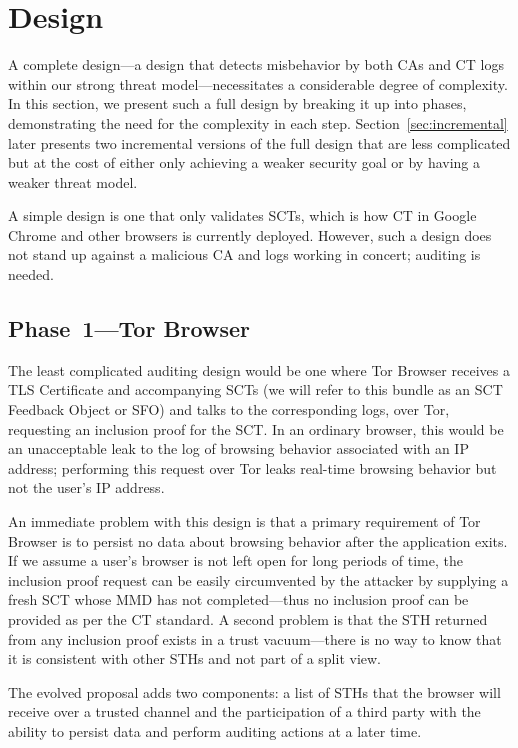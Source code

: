 \section{Design} \label{sec:base}

A complete design---a design that detects misbehavior by both CAs and CT logs
within our strong threat model---necessitates a considerable degree of
complexity. In this section, we present such a full design by breaking it up
into phases, demonstrating the need for the complexity in each step.
Section~\ref{sec:incremental} later presents two incremental versions of the
full design that are less complicated but at the cost of either only achieving a
weaker security goal or by having a weaker threat model.

A simple design is one that only validates SCTs, which is how CT in Google
Chrome and other browsers is currently deployed. However, such a design does not
stand up against a malicious CA and logs working in concert; auditing is needed.

\subsection{Phase~1---Tor Browser} \label{sec:base:phase1}

The least complicated auditing design would be one where Tor Browser receives a
TLS Certificate and accompanying SCTs (we will refer to this bundle as an SCT
Feedback Object or SFO) and talks to the corresponding logs, over Tor,
requesting an inclusion proof for the SCT. In an ordinary browser, this would be
an unacceptable leak to the log of browsing behavior associated with an IP
address; performing this request over Tor leaks real-time browsing behavior but
not the user's IP address.

An immediate problem with this design is that a primary requirement of Tor
Browser is to persist no data about browsing behavior after the application
exits. If we assume a user's browser is not left open for long periods of time,
the inclusion proof request can be easily circumvented by the attacker by
supplying a fresh SCT whose MMD has not completed---thus no inclusion proof can
be provided as per the CT standard. A second problem is that the STH returned
from any inclusion proof exists in a trust vacuum---there is no way to know that
it is consistent with other STHs and not part of a split view.

The evolved proposal adds two components: a list of STHs that the browser will
receive over a trusted channel and the participation of a third party with the
ability to persist data and perform auditing actions at a later time.

